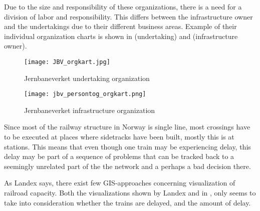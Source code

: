 Due to the size and responsibility of these organizations, there is a need for 
a division of labor and responsibility. This differs between the 
infrastructure owner and the undertakings due to their different business 
areas. Example of their individual organization charts is shown in  (undertaking) and  (infrastructure owner).

\begin{figure}[!htbp]
	\texttt{[image: JBV\_orgkart.jpg]}
	\caption[Jernbaneverket undertaking organization]{Jernbaneverket undertaking organization \cite{sintefPresis}}
	\label{fig:jbv_undertaking_org_map}
\end{figure}

\begin{figure}[!htbp]
	\texttt{[image: jbv\_persontog\_orgkart.png]}
	\caption[Jernbaneverket infrastructure organization]{Jernbaneverket infrastructure organization \cite{jernbaneverketOrganisasjon}}
	\label{fig:jbv_infrastructure_org_map}
\end{figure}

Since most of the railway structure in Norway is single line, most crossings
have to be executed at places where sidetracks have been built, mostly this is
at stations. This means that even though one train may be experiencing delay, 
this delay may be part of a sequence of problems that can be tracked back to a 
seemingly unrelated part of the the network and a perhaps a bad decision there\cite{cule2011mining}.

As Landex\cite{landex2009gis} says, there exist few GIS-approaches concerning
visualization of railroad capacity. Both the visualizations shown by Landex and
in  , 
only seems to take into consideration whether
the trains are delayed, and the amount of delay. 

